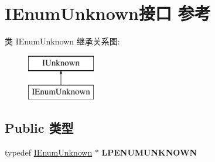 \hypertarget{interface_i_enum_unknown}{}\section{I\+Enum\+Unknown接口 参考}
\label{interface_i_enum_unknown}
类 I\+Enum\+Unknown 继承关系图\+:\begin{figure}[H]
\begin{center}
\leavevmode
\includegraphics[height=2.000000cm]{interface_i_enum_unknown}
\end{center}
\end{figure}
\subsection*{Public 类型}
\begin{DoxyCompactItemize}
\item 
\mbox{\label{interface_i_enum_unknown_acacabc95aac7bc3d990bbfb001c9002c}} 
typedef \hyperlink{interface_i_enum_unknown}{I\+Enum\+Unknown} $\ast$ {\bfseries L\+P\+E\+N\+U\+M\+U\+N\+K\+N\+O\+WN}
\end{DoxyCompactItemize}
